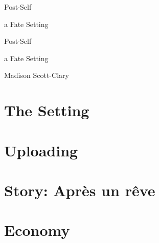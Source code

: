 \documentclass[11pt]{memoir}
\begin{document}
  \frontmatter

  \thispagestyle{empty}
  \null
  \vfill
  \begin{flushright}
    \DisplayFont Post$\cdot$Self

    \vspace{1ex}

    {\footnotesize a Fate Setting}
  \end{flushright}
  \vfill
  \cleardoublepage

  \pagestyle{plain}

  \doublespacing

  \begin{flushright}
    \null
    \vfill
    {\Huge\DisplayFont Post$\cdot$Self}

    \vspace{1ex}

    {\Large\DisplayFont a Fate Setting}

    \vfill

    {\Large\DisplayFont Madison Scott-Clary}
  \end{flushright}
  \thispagestyle{empty}

  \newpage

  

  \tableofcontents*
  \newpage
  \null
  \cleardoublepage

  \onehalfspacing

  

  \mainmatter

  \pagestyle{ourbook}

  
  \cleartoverso
  \chapter{The Setting}

  \cleartoverso
  \chapter{Uploading}
  
  
  \cleartoverso
  \chapter{Story: Après un rêve}
  

  \cleartoverso
  \chapter{Economy}
  
\end{document}
